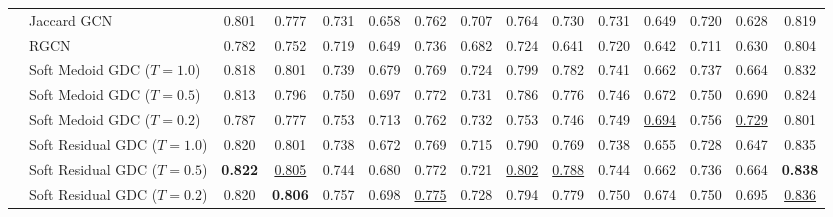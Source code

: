 \documentclass{article} %
\begin{document}
\begin{table}
{\begin{tabular}{llccccccccccccc}
                           & Jaccard GCN &              0.801 &              0.777 &              0.731 &              0.658 &              0.762 &              0.707 &              0.764 &              0.730 &              0.731 &              0.649 &              0.720 &              0.628 &              0.819 \\
                           & RGCN &              0.782 &              0.752 &              0.719 &              0.649 &              0.736 &              0.682 &              0.724 &              0.641 &              0.720 &              0.642 &              0.711 &              0.630 &              0.804 \\
                           & Soft Medoid GDC ($T=1.0$) &              0.818 &              0.801 &              0.739 &              0.679 &              0.769 &              0.724 &              0.799 &              0.782 &              0.741 &              0.662 &              0.737 &              0.664 &              0.832 \\
                           & Soft Medoid GDC ($T=0.5$) &              0.813 &              0.796 &              0.750 &              0.697 &              0.772 &              0.731 &              0.786 &              0.776 &              0.746 &              0.672 &              0.750 &              0.690 &              0.824 \\
                           & Soft Medoid GDC ($T=0.2$) &              0.787 &              0.777 &              0.753 &              0.713 &              0.762 &              0.732 &              0.753 &              0.746 &              0.749 &  \underline{0.694} &              0.756 &  \underline{0.729} &              0.801 \\
                           & Soft Residual GDC ($T=1.0$) &              0.820 &              0.801 &              0.738 &              0.672 &              0.769 &              0.715 &              0.790 &              0.769 &              0.738 &              0.655 &              0.728 &              0.647 &              0.835 \\
                           & Soft Residual GDC ($T=0.5$) &     \textbf{0.822} &  \underline{0.805} &              0.744 &              0.680 &              0.772 &              0.721 &  \underline{0.802} &  \underline{0.788} &              0.744 &              0.662 &              0.736 &              0.664 &     \textbf{0.838} \\
                           & Soft Residual GDC ($T=0.2$) &              0.820 &     \textbf{0.806} &              0.757 &              0.698 &  \underline{0.775} &              0.728 &              0.794 &              0.779 &              0.750 &              0.674 &              0.750 &              0.695 &  \underline{0.836} \\

\end{tabular}}
\end{table}
\end{document}
